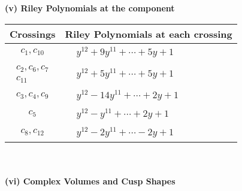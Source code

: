 \documentclass[1p]{elsarticle_modified}
\theoremstyle{definition}
\begin{document}
\newpage\renewcommand{\arraystretch}{1}
\flushleft \textbf{(v) Riley Polynomials at the component}\newline \\
\begin{tabular}{m{50pt}|m{274pt}}
Crossings & \hspace{64pt}Riley Polynomials at each crossing \\
\hline $$\begin{aligned}c_{1},c_{10}\end{aligned}$$&$\begin{aligned}
&y^{12}+9 y^{11}+\cdots+5 y+1
\end{aligned}$\\
\hline $$\begin{aligned}c_{2},c_{6},c_{7}\\c_{11}\end{aligned}$$&$\begin{aligned}
&y^{12}+5 y^{11}+\cdots+5 y+1
\end{aligned}$\\
\hline $$\begin{aligned}c_{3},c_{4},c_{9}\end{aligned}$$&$\begin{aligned}
&y^{12}-14 y^{11}+\cdots+2 y+1
\end{aligned}$\\
\hline $$\begin{aligned}c_{5}\end{aligned}$$&$\begin{aligned}
&y^{12}- y^{11}+\cdots+2 y+1
\end{aligned}$\\
\hline $$\begin{aligned}c_{8},c_{12}\end{aligned}$$&$\begin{aligned}
&y^{12}-2 y^{11}+\cdots-2 y+1
\end{aligned}$\\
\hline
\end{tabular}\\~\\
\newpage\flushleft \textbf{(vi) Complex Volumes and Cusp Shapes}
\end{document}
